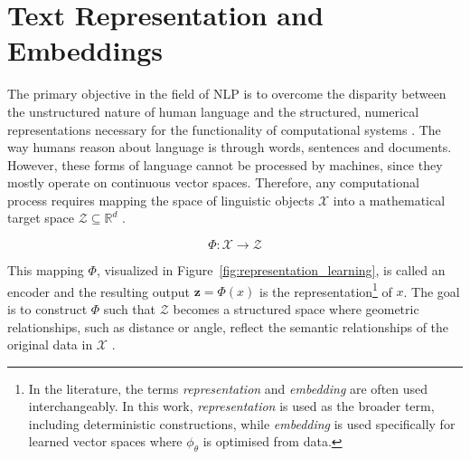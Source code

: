 \section{Text Representation and Embeddings}
\label{sec:embeddings}

The primary objective in the field of \ac{NLP} is to overcome the disparity between the unstructured nature of human language and the structured, numerical representations necessary for the functionality of computational systems \cite{Liddy2001, Bengio2012RepresentationLA}. The way humans reason about language is through words, sentences and documents. However, these forms of language cannot be processed by machines, since they mostly operate on continuous vector spaces. Therefore, any computational process requires mapping the space of linguistic objects $\mathcal{X}$ into a mathematical target space $\mathcal{Z} \subseteq \mathbb{R}^d$ \cite{Liddy2001, Turney2010}\cite[p. 374f.]{Bishop2024}.


\begin{equation}
    \Phi : \mathcal{X} \to \mathcal{Z}
    \label{eq:embedding_general}
\end{equation}

This mapping $\Phi$, visualized in Figure~\ref{fig:representation_learning}, is called an encoder and the resulting output $\mathbf{z} = \Phi(x)$ is the representation\footnote{In the literature, the terms \emph{representation} and \emph{embedding} are often used interchangeably. In this work, \emph{representation} is used as the broader term, including deterministic constructions, while \emph{embedding} is used specifically for learned vector spaces where $\phi_\theta$ is optimised from data.} of $x$. The goal is to construct $\Phi$ such that $\mathcal{Z}$ becomes a structured space where geometric relationships, such as distance or angle, reflect the semantic relationships of the original data in $\mathcal{X}$ \cite[p.~374~f.]{Bishop2024}\cite{Mikolov2013, Dandapat2011NitinIA}.


